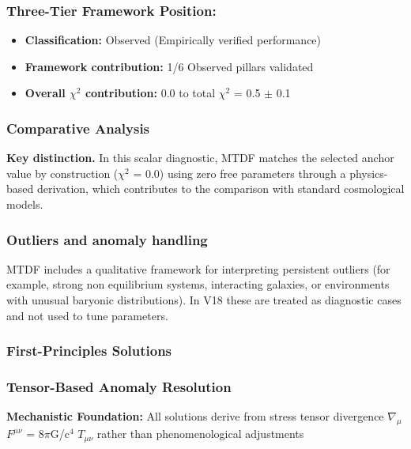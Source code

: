 \documentclass[11pt,a4paper]{article}
\begin{document}
\begin{mdframed}
\begin{mdframed}
\subsubsection{Three-Tier Framework Position:}
\begin{itemize}
  \item \textbf{Classification:} \checkmark{} Observed (Empirically verified performance)
  \item \textbf{Framework contribution:} 1/\allowbreak{}6 Observed pillars validated
  \item \textbf{Overall $\chi$$^{2}$ contribution:} 0.0 to total $\chi$$^{2}$ = 0.5 $\pm$ 0.1
\end{itemize}
\end{mdframed}

\subsubsection{Comparative Analysis}
\textbf{Key distinction.} In this scalar diagnostic, MTDF matches the selected anchor value by construction ($\chi$$^{2}$ = 0.0) using zero free parameters through a physics-based derivation, which contributes to the comparison with standard cosmological models.
\end{mdframed}

\subsubsection{Outliers and anomaly handling}
MTDF includes a qualitative framework for interpreting persistent outliers (for example, strong non equilibrium systems, interacting galaxies, or environments with unusual baryonic distributions). In V18 these are treated as diagnostic cases and not used to tune parameters.

\subsubsection{First-Principles Solutions}
\begin{mdframed}[linecolor=accent,linewidth=0.5pt,backgroundcolor=callout-bg,leftline=true,rightline=true,topline=true,bottomline=true,innerleftmargin=8pt,innerrightmargin=8pt,innertopmargin=6pt,innerbottommargin=6pt]
\subsubsection{Tensor-Based Anomaly Resolution}
\textbf{Mechanistic Foundation:} All solutions derive from stress tensor divergence $\nabla_\mu$$F^{\mu\nu}$ = 8$\pi$G/\allowbreak{}c$^{4}$ $T_{\mu\nu}$ rather than phenomenological adjustments
\end{mdframed}
\end{document}
